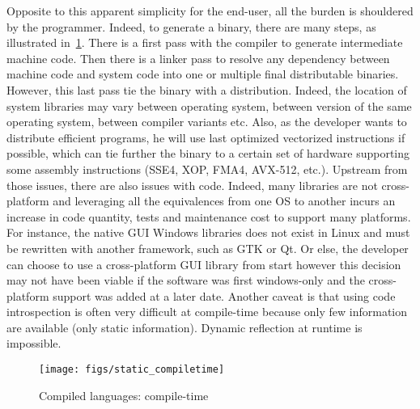 Opposite to this apparent simplicity for the end-user, all the burden is shouldered by the programmer. Indeed, to
generate a binary, there are many steps, as illustrated in~\cref{fig:static.dynamic.compiled.compiletime}. There is a
first pass with the compiler to generate intermediate machine code. Then there is a linker pass to resolve any
dependency between machine code and system code into one or multiple final distributable binaries. However, this last
pass tie the binary with a distribution. Indeed, the location of system libraries may vary between operating system,
between version of the same operating system, between compiler variants etc. Also, as the developer wants to distribute
efficient programs, he will use last optimized vectorized instructions if possible, which can tie further the binary to
a certain set of hardware supporting some assembly instructions (SSE4, XOP, FMA4, AVX-512, etc.). Upstream from those
issues, there are also issues with code. Indeed, many libraries are not cross-platform and leveraging all the
equivalences from one OS to another incurs an increase in code quantity, tests and maintenance cost to support many
platforms. For instance, the native GUI Windows libraries does not exist in Linux and must be rewritten with another
framework, such as GTK or Qt. Or else, the developer can choose to use a cross-platform GUI library from start however
this decision may not have been viable if the software was first windows-only and the cross-platform support was added
at a later date. Another caveat is that using code introspection is often very difficult at compile-time because only
few information are available (only static information). Dynamic reflection at runtime is impossible.

\begin{figure}[tbh]
  \centering
  \texttt{[image: figs/static\_compiletime]}
  \caption{Compiled languages: compile-time}
  \label{fig:static.dynamic.compiled.compiletime}
\end{figure}

